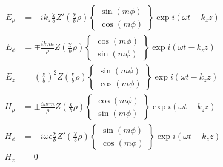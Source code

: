 \documentclass[twoside, a4paper]{article}
\begin{document}
\begin{align*}
E_\rho 	& = - i k_z \frac{\chi}{b} 
			Z' \left( \frac{\chi}{b} \rho \right) 
			\left\{
			\begin{array}{c}
			\sin \left( m \phi \right) \\
			\cos \left( m \phi \right)
			\end{array}
			\right\}
			\exp i \left( \omega t - k_z z \right) \\
E_\phi 	& = \mp \frac{i k_z m}{\rho}
			Z \left( \frac{\chi}{b} \rho \right)
			\left\{
			\begin{array}{c}
			\cos \left( m \phi \right) \\
			\sin \left( m \phi \right)
			\end{array}
			\right\}
			\exp i \left( \omega t - k_z z \right) \\		
E_z		& = \left( \frac{\chi}{b} \right)^2
			Z \left( \frac{\chi}{b} \rho \right)
			\left\{
			\begin{array}{c}
			\sin \left( m \phi \right) \\
			\cos \left( m \phi \right)
			\end{array}
			\right\}
			\exp i \left( \omega t - k_z z \right)
\end{align*}
\begin{align*}
H_\rho	& = \pm \frac{i \omega \epsilon m}{\rho}
			Z \left( \frac{\chi}{b} \rho \right)
			\left\{
			\begin{array}{c}
			\cos \left( m \phi \right) \\
			\sin \left( m \phi \right)
			\end{array}
			\right\}
			\exp i \left( \omega t - k_z z \right) \\
H_\phi	& = - i \omega \epsilon \frac{\chi}{b}
			Z' \left( \frac{\chi}{b} \rho \right)
			\left\{
			\begin{array}{c}
			\sin \left( m \phi \right) \\
			\cos \left( m \phi \right)
			\end{array}
			\right\}
			\exp i \left( \omega t - k_z z \right) \\
H_z		& = 0
\end{align*}

\newpage
\end{document}
